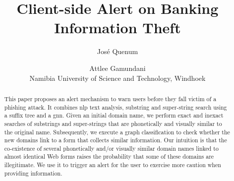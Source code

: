 \documentclass{article}
\title[Phishing Banking Information]{Client-side Alert on Banking Information Theft}
\author[Quenum and Gamundani]{%
  Jos\'{e} Quenum \and Attlee Gamundani\\
Namibia University of Science and Technology, Windhoek\\
\email{jquenum@nust.na\quad agamundani@nust.na}}
\theoremstyle{definition}
\begin{document}
\maketitle

\begin{abstract}

  This paper proposes an alert mechanism to warn users before they fall victim of a phishing attack. It combines \gls{nlp} text analysis, substring and super-string search using a suffix tree and a \gls{gnn}. Given an initial domain name, we perform exact and inexact searches of substrings and super-strings that are phonetically and visually similar to the original name. Subsequently, we execute a graph classification to check whether the new domains link to a form that collects similar information. Our intuition is that the co-existence of several phonetically and/or visually similar domain names linked to almost identical Web forms raises the probability that some of these domains are illegitimate. We use it to trigger an alert for the user to exercise more caution when providing information.

\end{abstract}

\glsresetall
\end{document}
